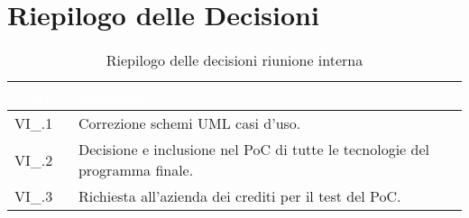 \section{Riepilogo delle Decisioni}


\begin{table}[!htbp]
\renewcommand{\arraystretch}{1.5}
\begin{tabular}{m{}<{\centering}  m{}<{\centering}}
\rowcolor{darkblue} \textcolor{white}{\textbf{Codice}} & \textcolor{white}{\textbf{Decisione}} \\
\hline
VI\_\D{}.1 & Correzione schemi UML casi d'uso.\\
\rowcolor{gray!25} VI\_\D{}.2 & Decisione e inclusione nel PoC di tutte le tecnologie del programma finale.\\
VI\_\D{}.3 & Richiesta all'azienda dei crediti per il test del PoC.\\
\end{tabular}
\caption{Riepilogo delle decisioni riunione interna \D{}}
\end{table}